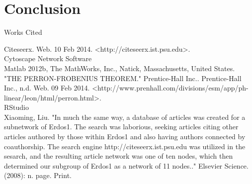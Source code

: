 \documentclass[17pt]{extarticle}
\begin{document}
\section{Conclusion}
\begin{center}
 Works Cited



Citeseerx. Web. 10 Feb 2014. <http://citeseerx.ist.psu.edu>.\\
Cytoscape Network Software\\

Matlab 2012b, The MathWorks, Inc., Natick, Massachusetts, United States.\\

"THE PERRON-FROBENIUS THEOREM." Prentice-Hall Inc.. Prentice-Hall Inc., n.d. Web. 09 Feb 2014. <http://www.prenhall.com/divisions/esm/app/ph-linear/leon/html/perron.html>.\\
RStudio\\

Xiaoming, Liu. "In much the same way, a database of articles was created for a subnetwork of Erdos1. The search was laborious, seeking articles citing other articles authored by those within Erdos1 and also having authors connected by coauthorship. The search engine http://citeseerx.ist.psu.edu was utilized in the sesarch, and the resulting article network was one of ten nodes, which then determined our subgroup of Erdos1 as a network of 11 nodes.." Elsevier Science. (2008): n. page. Print.

\end{center}
\end{document}
